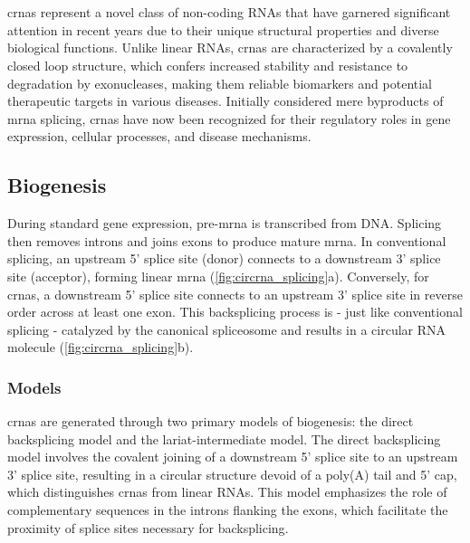 \section{}
\label{sec:circrnas}

\Glspl{crna} represent a novel class of non-coding RNAs that have garnered
significant attention in recent years due to their unique structural properties
and diverse biological functions.
Unlike linear RNAs, \glspl{crna} are characterized by a covalently closed loop
structure, which confers increased stability and resistance to degradation by
exonucleases, making them reliable biomarkers and potential therapeutic targets
in various
diseases\supercite{ma_circular_2020,hoque_exploring_2023,wilusz_circular_2017}.
Initially considered mere byproducts of \gls{mrna} splicing, \glspl{crna} have
now been recognized for their regulatory roles in gene expression, cellular
processes, and disease
mechanisms\supercite{cherubini_foxp1_2019,wilusz_360_2018}.

\subsection{Biogenesis}
\label{sec:circrna_biogenesis}
During standard gene expression, pre-\gls{mrna} is transcribed from DNA.
Splicing then removes introns and joins exons to produce mature
\gls{mrna}\supercite{black_mechanisms_2003}.
In conventional splicing, an upstream 5' splice site (donor) connects to a
downstream 3' splice site (acceptor), forming linear \gls{mrna}
(\cref{fig:circrna_splicing}a).
Conversely, for \glspl{crna}, a downstream 5' splice site connects to an
upstream 3' splice site in reverse order across at least one
exon\supercite{chen_expanding_2020}.
This backsplicing process is - just like conventional splicing - catalyzed by
the canonical spliceosome\supercite{starke_exon_2015} and results in a circular
RNA molecule (\cref{fig:circrna_splicing}b).

\subsubsection{Models}

\glspl{crna} are generated through two primary models of
biogenesis: the direct backsplicing model and the lariat-intermediate model.
The direct backsplicing model involves the covalent joining of a downstream 5'
splice site to an upstream 3' splice site, resulting in a circular structure
devoid of a poly(A) tail and 5' cap, which distinguishes \glspl{crna} from
linear RNAs\supercite{zhang_complementary_2014,ferreira_circular_2018}.
This model emphasizes the role of complementary sequences in the introns
flanking the exons, which facilitate the proximity of splice sites necessary
for backsplicing\supercite{zhang_complementary_2014,meganck_engineering_2021}.

